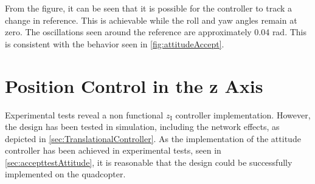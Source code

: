 From the figure, it can be seen that it is possible for the controller to track a change in reference. This is achievable while the roll and yaw angles remain at zero. The oscillations seen around the reference are approximately 0.04 rad. This is consistent with the behavior seen in \autoref{fig:attitudeAccept}.



\section{Position Control in the z Axis}

Experimental tests reveal a non functional $z_{\mathrm{I}}$ controller implementation. However, the design has been tested in simulation, including the network effects, as depicted in \autoref{sec:TranslationalController}. As the implementation of the attitude controller has been achieved in experimental tests, seen in \autoref{sec:accepttestAttitude}, it is reasonable that the design could be successfully implemented on the quadcopter.



